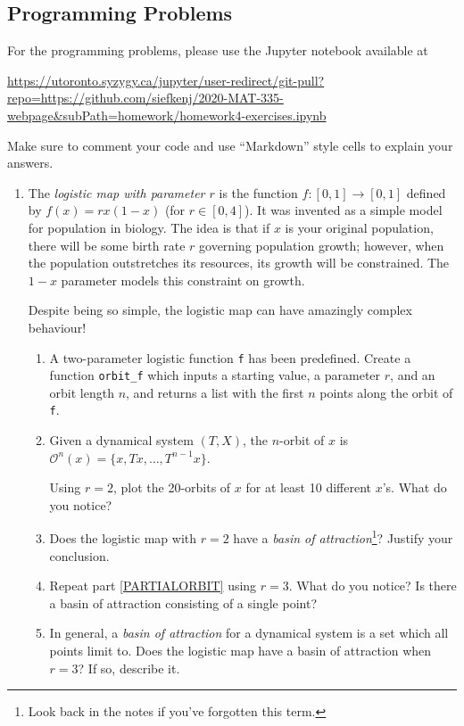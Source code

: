 \documentclass[letter]{article}
\begin{document}
	\subsection*{Programming Problems}
	For the programming problems, please use the Jupyter notebook available at

	\url{https://utoronto.syzygy.ca/jupyter/user-redirect/git-pull?repo=https://github.com/siefkenj/2020-MAT-335-webpage&subPath=homework/homework4-exercises.ipynb}

	Make sure to comment your code and use ``Markdown'' style cells to explain your answers.

	\begin{enumerate}
		\item The \emph{logistic map with parameter $r$} is the function $f:[0,1]\to[0,1]$ defined by $f(x)=rx(1-x)$ (for $r\in[0,4]$).
			It was invented as a simple model for population in biology. The idea is that if $x$ is your original population,
			there will be some birth rate $r$ governing population growth; however, when the population outstretches its
			resources, its growth will be constrained. The $1-x$ parameter models this constraint on growth.

			Despite being so simple, the logistic map can have amazingly complex behaviour!

		\begin{enumerate}
			\item A two-parameter logistic function {\tt f} has been predefined. Create a function \verb|orbit_f| which inputs
				a starting value, a parameter $r$, and an orbit length $n$, and returns a list with the first
				$n$ points along the orbit of {\tt f}.

			\item \label{PARTIALORBIT}Given a dynamical system $(T,X)$, the $n$-orbit of $x$ is $\mathcal O^n(x)=\{x,Tx,\ldots, T^{n-1}x\}$.

				Using $r=2$, plot the 20-orbits of $x$ for at least 10 different $x$'s. What do you notice?
			\item Does the logistic map with $r=2$ have a \emph{basin of attraction}\footnote{ Look back in the notes
				if you've forgotten this term.}? Justify your conclusion.
			\item Repeat part \ref{PARTIALORBIT} using $r=3$. What do you notice? Is there a basin of attraction consisting of a single point?

			\item In general, a \emph{basin of attraction} for a dynamical system is a set which all points limit to.
				Does the logistic map have a basin of attraction when $r=3$? If so, describe it.


\end{enumerate}
\end{enumerate}
\end{document}

